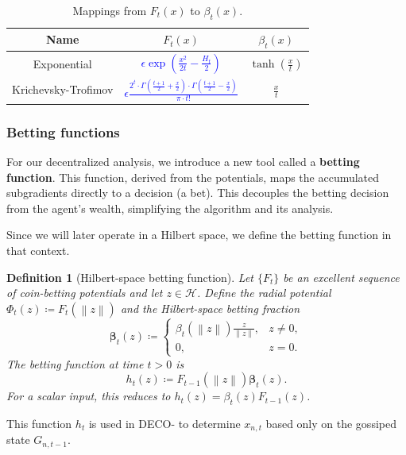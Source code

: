 \documentclass[journal]{IEEEtran}
\newtheorem{definition}{Definition}
\newcommand{\br}[1]{\left(#1\right)}
\newcommand{\norm}[1]{\left\lVert{#1}\right\rVert}
\newcommand{\Hil}{\mathcal{H}} %
\newcommand{\algname}{{DECO}\xspace}
\begin{document}
\begin{table}[H]
    \centering
    \caption{Mappings from $F_t(x)$ to $\beta_t(x)$.}\label{tab:mappings}
    \begin{tabular}{ccc}
        \toprule
        Name                & $F_t(x)$                                                                                                                                       & $\beta_t(x)$            \\
        \midrule
        Exponential         & \textcolor{blue}{$\epsilon\exp\br{\frac{x^2}{2t}-\frac{H_t}{2}}$}                                                                              & $\tanh\br{\frac{x}{t}}$ \\
        Krichevsky-Trofimov & \textcolor{blue}{$\epsilon\frac{2^t \cdot \Gamma\br{\frac{t+1}{2} + \frac{x}{2}} \cdot \Gamma\br{\frac{t+1}{2} - \frac{x}{2}}}{\pi \cdot t!}$} & $\frac{x}{t}$           \\
        \bottomrule
    \end{tabular}
\end{table}

\subsubsection*{Betting functions}
For our decentralized analysis, we introduce a new tool called a \textbf{betting function}.
This function, derived from the potentials, maps the accumulated subgradients directly to a decision (a bet).
This decouples the betting decision from the agent's wealth, simplifying the algorithm and its analysis.

    {\color{blue}
        Since we will later operate in a Hilbert space, we define the betting function in that context.
        \begin{definition}[Hilbert-space betting function]\label{def:betting-function}
            Let $\{F_t\}$ be an excellent sequence of coin-betting potentials and let $z\in\Hil$.
            Define the radial potential $\Phi_t(z)\coloneqq F_t(\norm{z})$ and the Hilbert-space betting fraction
            \begin{equation}
                \boldsymbol{\beta}_t(z) \coloneqq
                \begin{cases}
                    \displaystyle \beta_t(\norm{z})\frac{z}{\norm{z}}, & z\neq 0, \\
                    0,                                                 & z=0.
                \end{cases}
            \end{equation}
            The betting function at time $t>0$ is
            \begin{equation}
                h_t(z)\coloneqq F_{t-1}(\norm{z})\boldsymbol{\beta}_t(z).
            \end{equation}
            For a scalar input, this reduces to $h_t(z)=\beta_t(z)F_{t-1}(z)$.
        \end{definition}
    }
This function $h_t$ is used in \algname{}- to determine $x_{n,t}$ based only on the gossiped state $G_{n,t-1}$.
\end{document}
